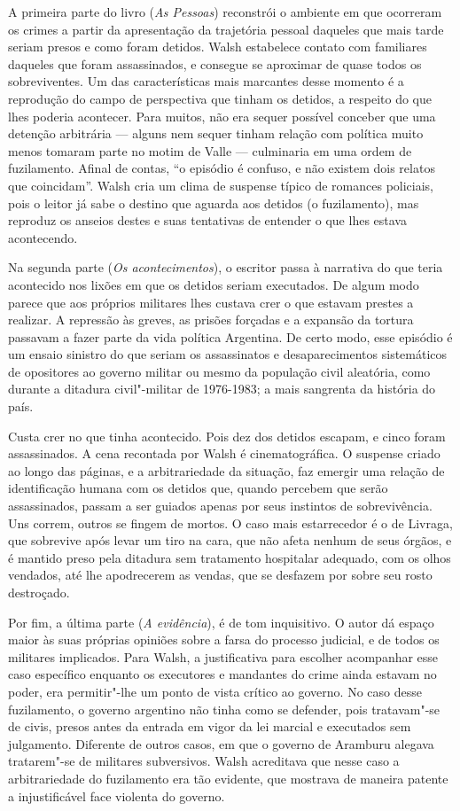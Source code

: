 A primeira parte do livro (\emph{As Pessoas}) reconstrói o ambiente em
que ocorreram os crimes a partir da apresentação da trajetória pessoal
daqueles que mais tarde seriam presos e como foram detidos. Walsh
estabelece contato com familiares daqueles que foram assassinados, e
consegue se aproximar de quase todos os sobreviventes. Um das
características mais marcantes desse momento é a reprodução do campo de
perspectiva que tinham os detidos, a respeito do que lhes poderia
acontecer. Para muitos, não era sequer possível conceber que uma
detenção arbitrária --- alguns nem sequer tinham relação com política
muito menos tomaram parte no motim de Valle --- culminaria em uma ordem
de fuzilamento. Afinal de contas, ``o episódio é confuso, e não existem
dois relatos que coincidam''. Walsh cria um clima de suspense típico de
romances policiais, pois o leitor já sabe o destino que aguarda aos
detidos (o fuzilamento), mas reproduz os anseios destes e suas
tentativas de entender o que lhes estava acontecendo.

Na segunda parte (\emph{Os acontecimentos}), o escritor passa à
narrativa do que teria acontecido nos lixões em que os detidos seriam
executados. De algum modo parece que aos próprios militares lhes custava
crer o que estavam prestes a realizar. A repressão às greves, as prisões
forçadas e a expansão da tortura passavam a fazer parte da vida política
Argentina. De certo modo, esse episódio é um ensaio sinistro do que
seriam os assassinatos e desaparecimentos sistemáticos de opositores ao
governo militar ou mesmo da população civil aleatória, como durante a
ditadura civil"-militar de 1976-1983; a mais sangrenta da história do
país.

Custa crer no que tinha acontecido. Pois dez dos detidos escapam, e
cinco foram assassinados. A cena recontada por Walsh é cinematográfica.
O suspense criado ao longo das páginas, e a arbitrariedade da situação,
faz emergir uma relação de identificação humana com os detidos que,
quando percebem que serão assassinados, passam a ser guiados apenas por
seus instintos de sobrevivência. Uns correm, outros se fingem de mortos.
O caso mais estarrecedor é o de Livraga, que sobrevive após levar um
tiro na cara, que não afeta nenhum de seus órgãos, e é mantido preso
pela ditadura sem tratamento hospitalar adequado, com os olhos vendados,
até lhe apodrecerem as vendas, que se desfazem por sobre seu rosto
destroçado.

Por fim, a última parte (\emph{A evidência}), é de tom inquisitivo. O
autor dá espaço maior às suas próprias opiniões sobre a farsa do
processo judicial, e de todos os militares implicados. Para Walsh, a
justificativa para escolher acompanhar esse caso específico enquanto os
executores e mandantes do crime ainda estavam no poder, era permitir"-lhe
um ponto de vista crítico ao governo. No caso desse fuzilamento, o
governo argentino não tinha como se defender, pois tratavam"-se de civis,
presos antes da entrada em vigor da lei marcial e executados sem
julgamento. Diferente de outros casos, em que o governo de Aramburu
alegava tratarem"-se de militares subversivos. Walsh acreditava que nesse
caso a arbitrariedade do fuzilamento era tão evidente, que mostrava de
maneira patente a injustificável face violenta do governo.

